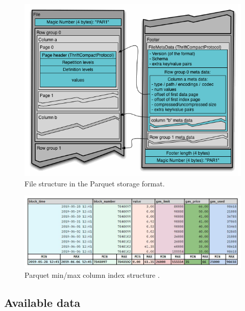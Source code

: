 \begin{figure}[!ht]
  \centering
  \includegraphics[width=1\textwidth]{Figures/parquet-structure.png}
  \caption[Parquet storage format structure]{File structure in the Parquet storage format\protect\footnotemark.}
  \label{fig:parquet-structure}
\end{figure}


\begin{figure}[!ht]
  \centering
  \includegraphics[width=1\textwidth]{Figures/parquet-index.jpg}
  \caption[Parquet ColumnIndex on Dune Analytics]{Parquet min/max column index structure \protect\footnotemark. }
  \label{fig:parquet-index}
\end{figure}



\subsection{Available data}

